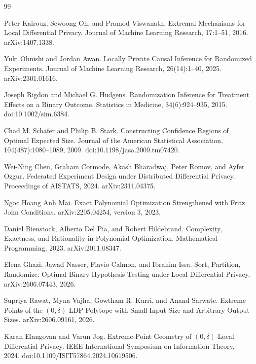 \documentclass{article}
\begin{document}
\begin{thebibliography}{99}

   Peter Kairouz, Sewoong Oh, and Pramod Viswanath. Extremal Mechanisms for Local Differential Privacy. Journal of Machine Learning Research, 17:1--51, 2016. arXiv:1407.1338.

   Yuki Ohnishi and Jordan Awan. Locally Private Causal Inference for Randomized Experiments. Journal of Machine Learning Research, 26(14):1--40, 2025. arXiv:2301.01616.

   Joseph Rigdon and Michael G. Hudgens. Randomization Inference for Treatment Effects on a Binary Outcome. Statistics in Medicine, 34(6):924--935, 2015. doi:10.1002/sim.6384.

   Chad M. Schafer and Philip B. Stark. Constructing Confidence Regions of Optimal Expected Size. Journal of the American Statistical Association, 104(487):1080--1089, 2009. doi:10.1198/jasa.2009.tm07420.

   Wei-Ning Chen, Graham Cormode, Akash Bharadwaj, Peter Romov, and Ayfer Ozgur. Federated Experiment Design under Distributed Differential Privacy. Proceedings of AISTATS, 2024. arXiv:2311.04375.

   Ngoc Hoang Anh Mai. Exact Polynomial Optimization Strengthened with Fritz John Conditions. arXiv:2205.04254, version 3, 2023.

   Daniel Bienstock, Alberto Del Pia, and Robert Hildebrand. Complexity, Exactness, and Rationality in Polynomial Optimization. Mathematical Programming, 2023. arXiv:2011.08347.

   Elena Ghazi, Jawad Nasser, Flavio Calmon, and Ibrahim Issa. Sort, Partition, Randomize: Optimal Binary Hypothesis Testing under Local Differential Privacy. arXiv:2606.07443, 2026.

   Supriya Rawat, Myna Vajha, Gowtham R. Kurri, and Anand Sarwate. Extreme Points of the \((0,\delta)\)-LDP Polytope with Small Input Size and Arbitrary Output Sizes. arXiv:2606.09161, 2026.

   Karan Elangovan and Varun Jog. Extreme-Point Geometry of \((0,\delta)\)-Local Differential Privacy. IEEE International Symposium on Information Theory, 2024. doi:10.1109/ISIT57864.2024.10619506.


\end{thebibliography}
\end{document}
